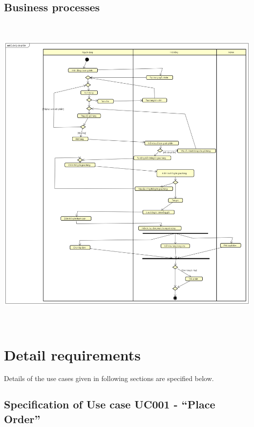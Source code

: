 \documentclass[letterpaper]{report}
\begin{document}
\section{Business processes \ \ \ \ \ \ \ \ }
\includegraphics[width=15.24cm,height=16.261cm]{UseCaseSpecification-img/UseCaseSpecification-img002.png}

\chapter{Detail requirements}
Details of the use cases given in following sections are specified below.
\bigskip

\section[Specification of Use case UC001 {}- “Place Order”]{Specification of Use case UC001 - “Place Order”}


\end{document}
